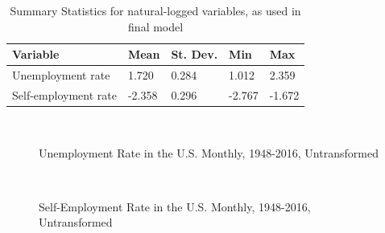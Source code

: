 \documentclass[]{ecca}
\begin{document}
\begin{table}[!h]
	\centering
	\caption{Summary Statistics for natural-logged variables, as used in final model}
	\label{sumstat2}
	\begin{tabular}{lllll}
		\hline
Variable            & Mean   & St. Dev. & Min    & Max            \\
\hline
Unemployment rate    & 1.720  & 0.284  & 1.012     & 2.359 \\
Self-employment rate & -2.358 & 0.296    & -2.767 & -1.672 \\
\hline
	\end{tabular}
\end{table}

\begin{figure}[!h]
	\centering
	\medskip\\
	\caption{Unemployment Rate in the U.S. Monthly, 1948-2016, Untransformed}
	\label{fig:data1}
\end{figure}
\begin{figure}[!h]
	\centering
	\medskip\\
	\caption{Self-Employment Rate in the U.S. Monthly, 1948-2016, Untransformed}
	\label{fig:data2}
\end{figure}
\textit{}
\end{document}
